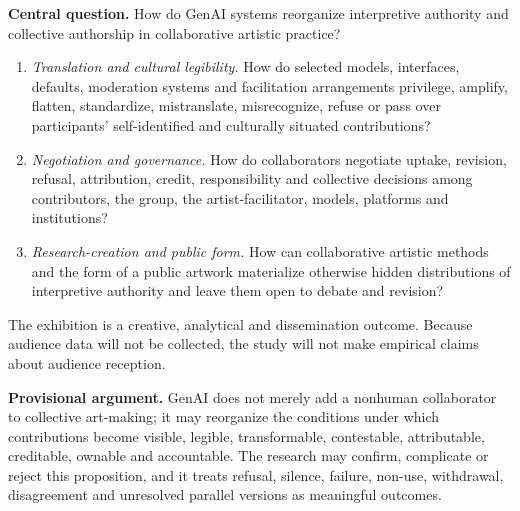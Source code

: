 \textbf{Central question.} How do GenAI systems reorganize interpretive
authority and collective authorship in collaborative artistic practice?

\begin{enumerate}[label=\textbf{SQ\arabic*.}, leftmargin=*]
  \item \emph{Translation and cultural legibility.} How do selected models,
        interfaces, defaults, moderation systems and facilitation
        arrangements privilege, amplify, flatten, standardize, mistranslate,
        misrecognize, refuse or pass over participants' self-identified and
        culturally situated contributions?
  \item \emph{Negotiation and governance.} How do collaborators negotiate
        uptake, revision, refusal, attribution, credit, responsibility and
        collective decisions among contributors, the group, the
        artist-facilitator, models, platforms and institutions?
  \item \emph{Research-creation and public form.} How can collaborative
        artistic methods and the form of a public artwork materialize
        otherwise hidden distributions of interpretive authority and leave
        them open to debate and revision?
\end{enumerate}

The exhibition is a creative, analytical and dissemination outcome. Because
audience data will not be collected, the study will not make empirical
claims about audience reception.

\textbf{Provisional argument.} GenAI does not merely add a nonhuman
collaborator to collective art-making; it may reorganize the conditions
under which contributions become visible, legible, transformable,
contestable, attributable, creditable, ownable and accountable. The research
may confirm, complicate or reject this proposition, and it treats refusal,
silence, failure, non-use, withdrawal, disagreement and unresolved parallel
versions as meaningful outcomes.


